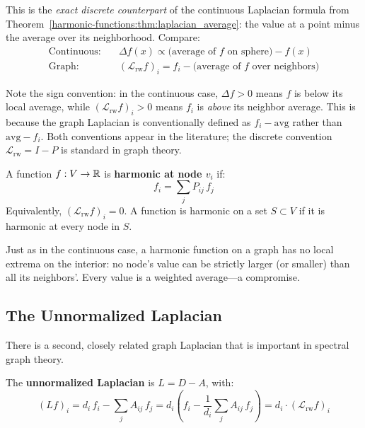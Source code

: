 \begin{notechapter}
This is the \emph{exact discrete counterpart} of the continuous Laplacian
formula from Theorem~\ref{harmonic-functions:thm:laplacian_average}: the value at a point minus
the average over its neighborhood. Compare:
\begin{align}
\text{Continuous:} &\quad \Delta f(x) \propto
  \bigl(\text{average of $f$ on sphere}\bigr) - f(x) \\
\text{Graph:} &\quad (\mathcal{L}_{\mathrm{rw}} f)_i
  = f_i - \bigl(\text{average of $f$ over neighbors}\bigr)
\end{align}

\begin{warningbox}
Note the sign convention: in the continuous case, $\Delta f > 0$ means $f$
is below its local average, while $(\mathcal{L}_{\mathrm{rw}} f)_i > 0$
means $f_i$ is \emph{above} its neighbor average. This is because the graph
Laplacian is conventionally defined as $f_i - \text{avg}$ rather than
$\text{avg} - f_i$. Both conventions appear in the literature; the discrete
convention $\mathcal{L}_{\mathrm{rw}} = I - P$ is standard in graph
theory.
\end{warningbox}

\begin{definition}
\label{harmonic-functions:def:harmonic_graph}
A function $f: V \to \mathbb{R}$ is \textbf{harmonic at node $v_i$} if:
\begin{equation}
f_i = \sum_j P_{ij}\,f_j
\end{equation}
Equivalently, $(\mathcal{L}_{\mathrm{rw}} f)_i = 0$. A function is harmonic
on a set $S \subset V$ if it is harmonic at every node in $S$.
\end{definition}

Just as in the continuous case, a harmonic function on a graph has no local
extrema on the interior: no node's value can be strictly larger (or smaller)
than all its neighbors'. Every value is a weighted average---a compromise.

\subsection{The Unnormalized Laplacian}

There is a second, closely related graph Laplacian that is important in
spectral graph theory.

\begin{definition}
\label{harmonic-functions:def:unnorm_laplacian}
The \textbf{unnormalized Laplacian} is $L = D - A$, with:
\begin{equation}
(Lf)_i = d_i\,f_i - \sum_j A_{ij}\,f_j
= d_i\left(f_i - \frac{1}{d_i}\sum_j A_{ij}\,f_j\right)
= d_i \cdot (\mathcal{L}_{\mathrm{rw}} f)_i
\end{equation}
\end{definition}


\end{notechapter}
